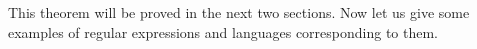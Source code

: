 

\setcounter{section}{2}
\setcounter{subsection}{1}
\setcounter{dfn}{3}


This theorem will be proved in the next two sections.
Now let us give some examples of regular expressions and languages corresponding to them.



